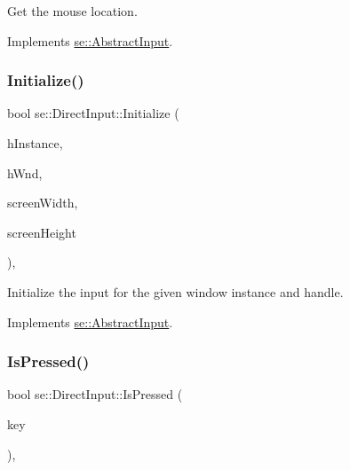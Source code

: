 Get the mouse location. 

Implements \mbox{\hyperlink{classse_1_1_abstract_input_a93673fb3534be8bbc1f495f650064b91}{se\+::\+Abstract\+Input}}.

\mbox{\label{classse_1_1_direct_input_ae8f8c4306ad58f7696548d2c63f01e6f}} 
\subsubsection{\texorpdfstring{Initialize()}{Initialize()}}
{\footnotesize\ttfamily bool se\+::\+Direct\+Input\+::\+Initialize (\begin{DoxyParamCaption}\item[{H\+I\+N\+S\+T\+A\+N\+CE}]{h\+Instance,  }\item[{H\+W\+ND}]{h\+Wnd,  }\item[{int}]{screen\+Width,  }\item[{int}]{screen\+Height }\end{DoxyParamCaption})\hspace{0.3cm}{\ttfamily [override]}, {\ttfamily [virtual]}}

Initialize the input for the given window instance and handle. 

Implements \mbox{\hyperlink{classse_1_1_abstract_input_a6219cdd66247d08f3ca52b2fea305b8d}{se\+::\+Abstract\+Input}}.

\mbox{\label{classse_1_1_direct_input_ad9669e6834c3fcac489050a82beb71f7}} 
\subsubsection{\texorpdfstring{Is\+Pressed()}{IsPressed()}}
{\footnotesize\ttfamily bool se\+::\+Direct\+Input\+::\+Is\+Pressed (\begin{DoxyParamCaption}\item[{\mbox{\hyperlink{namespacese_a94221cf8f238f1eadbe3ac4b8ac7bc71}{Keyboard\+Key}}}]{key }\end{DoxyParamCaption})\hspace{0.3cm}{\ttfamily [override]}, {\ttfamily [virtual]}}

